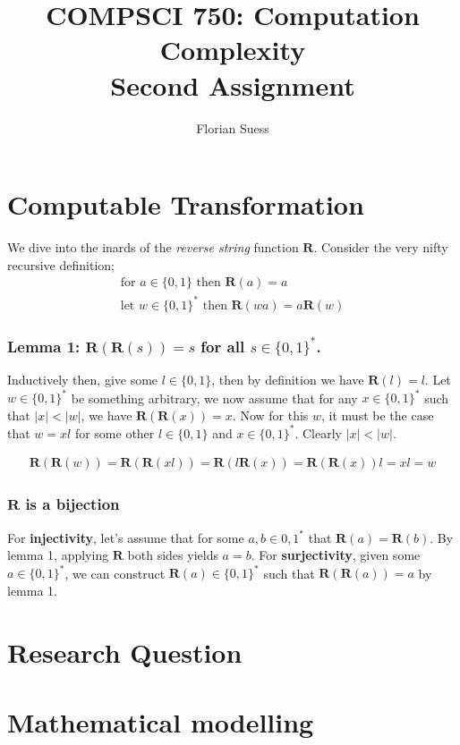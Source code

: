 \documentclass{article}
\title{COMPSCI 750: Computation Complexity \\ Second Assignment}
\author{Florian Suess}
\begin{document}
\maketitle

\section*{Computable Transformation}
We dive into the inards of the \emph{reverse string} function $\bm{R}$. Consider the very nifty recursive definition;
\begin{align*}
	\text{for } a \in \{0,1\} \text{ then } \bm{R}(a) = a \\
	\text{let } w \in \{0,1\}^* \text{ then } \bm{R}(wa) = a\bm{R}(w)
\end{align*}

\subsubsection*{Lemma 1: $\bm{R}(\bm{R}(s)) = s$ for all $s \in \{0,1\}^*$.}
Inductively then, give some $l \in \{0,1\}$, then by definition we have $\bm{R}(l) = l$. Let $w \in \{0,1\}^*$ be something arbitrary, we now assume that for any $x \in \{0,1\}^*$ such that $|x| < |w|$, we have $\bm{R}(\bm{R}(x)) = x$. Now for this $w$, it must be the case that $w = xl$ for some other $l \in \{0,1\}$ and $x \in \{0,1\}^*$. Clearly $|x| < |w|$.

\begin{align*}
	\bm{R}(\bm{R}(w)) = \bm{R}(\bm{R}(xl)) = \bm{R}(l\bm{R}(x)) = \bm{R}(\bm{R}(x))l = xl = w
\end{align*}

\subsubsection*{$\bm{R}$ is a bijection}
For \textbf{injectivity}, let's assume that for some $a,b \in {0,1}^*$ that $\bm{R}(a) = \bm{R}(b)$. By lemma 1, applying $\bm{R}$ both sides yields $a = b$. For \textbf{surjectivity}, given some $a \in \{0,1\}^*$, we can construct $\bm{R}(a) \in \{0,1\}^*$ such that $\bm{R}(\bm{R}(a)) = a$ by lemma 1.

\section*{Research Question}
\section*{Mathematical modelling}
\end{document}
